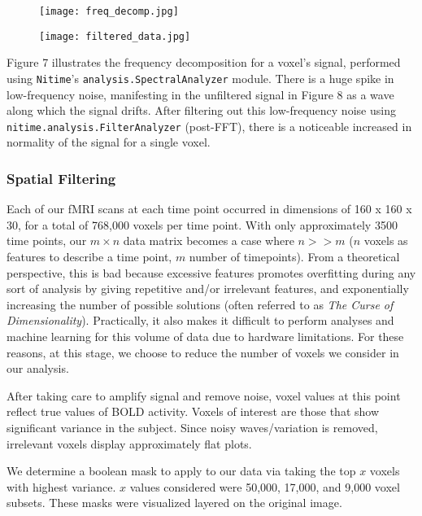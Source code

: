 \begin{figure}[H]
\centering
\begin{minipage}{.5\textwidth}
	\centering
	\texttt{[image: freq\_decomp.jpg]}
	\label{fig:test5}
\end{minipage}%
\begin{minipage}{.5\textwidth}
  \centering
  \texttt{[image: filtered\_data.jpg]}
  \label{fig:test1}
\end{minipage}
\end{figure}

\par Figure 7 illustrates the frequency decomposition for a voxel's signal, performed using \texttt{Nitime}'s \texttt{analysis.SpectralAnalyzer} module. There is a huge spike in low-frequency noise, manifesting in the unfiltered signal in Figure 8 as a wave along which the signal drifts. After filtering out this low-frequency noise using \texttt{nitime.analysis.FilterAnalyzer} (post-FFT), there is a noticeable increased in normality of the signal for a single voxel.

\subsubsection{Spatial Filtering}
\par Each of our fMRI scans at each time point occurred in dimensions of 160 x 160 x 30, for a total of 768,000 voxels per time point. With only approximately 3500 time points, our $m\times n$ data matrix becomes a case where $n >> m$ ($n$ voxels as features to describe a time point, $m$ number of timepoints). From a theoretical perspective, this is bad because excessive features promotes overfitting during any sort of analysis by giving repetitive and/or irrelevant features, and exponentially increasing the number of possible solutions (often referred to as \textit{The Curse of Dimensionality}). Practically, it also makes it difficult to perform analyses and machine learning for this volume of data due to hardware limitations. For these reasons, at this stage, we choose to reduce the number of voxels we consider in our analysis.
\par After taking care to amplify signal and remove noise, voxel values at this point reflect true values of BOLD activity. Voxels of interest are those that show significant variance in the subject. Since noisy waves/variation is removed, irrelevant voxels display approximately flat plots. 
\par We determine a boolean mask to apply to our data via taking the top $x$ voxels with highest variance. $x$ values considered were 50,000, 17,000, and 9,000 voxel subsets. These masks were visualized layered on the original image.

